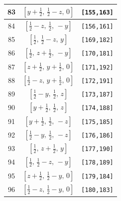 \documentclass[fleqn,8pt]{jsarticle}
\begin{document}
\begin{longtable}{ccc}
83 & $\left[ y + \frac{1}{2},\, \frac{1}{2} - z,\, 0 \right]$ & {\tt [155,163]} \\ \hline
84 & $\left[ \frac{1}{2} - z,\, \frac{1}{2},\, - y \right]$ & {\tt [156,161]} \\ \hline
85 & $\left[ \frac{1}{2},\, \frac{1}{2} - z,\, y \right]$ & {\tt [169,182]} \\ \hline
86 & $\left[ \frac{1}{2},\, z + \frac{1}{2},\, - y \right]$ & {\tt [170,181]} \\ \hline
87 & $\left[ z + \frac{1}{2},\, y + \frac{1}{2},\, 0 \right]$ & {\tt [171,192]} \\ \hline
88 & $\left[ \frac{1}{2} - z,\, y + \frac{1}{2},\, 0 \right]$ & {\tt [172,191]} \\ \hline
89 & $\left[ \frac{1}{2} - y,\, \frac{1}{2},\, z \right]$ & {\tt [173,187]} \\ \hline
90 & $\left[ y + \frac{1}{2},\, \frac{1}{2},\, z \right]$ & {\tt [174,188]} \\ \hline
91 & $\left[ y + \frac{1}{2},\, \frac{1}{2},\, - z \right]$ & {\tt [175,185]} \\ \hline
92 & $\left[ \frac{1}{2} - y,\, \frac{1}{2},\, - z \right]$ & {\tt [176,186]} \\ \hline
93 & $\left[ \frac{1}{2},\, z + \frac{1}{2},\, y \right]$ & {\tt [177,190]} \\ \hline
94 & $\left[ \frac{1}{2},\, \frac{1}{2} - z,\, - y \right]$ & {\tt [178,189]} \\ \hline
95 & $\left[ z + \frac{1}{2},\, \frac{1}{2} - y,\, 0 \right]$ & {\tt [179,184]} \\ \hline
96 & $\left[ \frac{1}{2} - z,\, \frac{1}{2} - y,\, 0 \right]$ & {\tt [180,183]} \\
\end{longtable}
\renewcommand{\arraystretch}{1.2}
\end{document}
